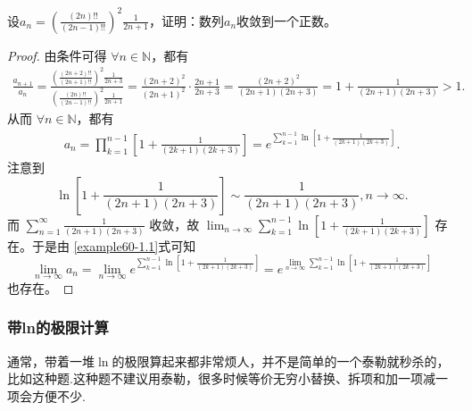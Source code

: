 \documentclass[../../main.tex]{subfiles}%
\begin{document}
\begin{example}
设\(a_n=\left(\frac{(2n)!!}{(2n - 1)!!}\right)^2\frac{1}{2n + 1}\)，证明：数列\(a_n\)收敛到一个正数。
\end{example}
\begin{proof}

由条件可得 \(\forall n\in \mathbb{N}\)，都有
\begin{align*}
\frac{a_{n+1}}{a_n}=\frac{\left( \frac{(2n+2)!!}{(2n+1)!!} \right) ^2\frac{1}{2n+3}}{\left( \frac{(2n)!!}{(2n-1)!!} \right) ^2\frac{1}{2n+1}}=\frac{\left( 2n+2 \right) ^2}{\left( 2n+1 \right) ^2}\cdot \frac{2n+1}{2n+3}=\frac{\left( 2n+2 \right) ^2}{\left( 2n+1 \right) \left( 2n+3 \right)}=1+\frac{1}{\left( 2n+1 \right) \left( 2n+3 \right)}>1.
\end{align*}
从而 \(\forall n\in \mathbb{N}\)，都有
\begin{align}
a_n=\prod_{k = 1}^{n - 1}\left[1+\frac{1}{(2k + 1)(2k + 3)}\right]=e^{\sum\limits_{k = 1}^{n - 1}\ln\left[1+\frac{1}{(2k + 1)(2k + 3)}\right]}. \label{example60-1.1}
\end{align}
注意到
\[
\ln\left[1+\frac{1}{(2n + 1)(2n + 3)}\right]\sim\frac{1}{(2n + 1)(2n + 3)},n\rightarrow\infty.
\]
而 \(\sum_{n = 1}^{\infty}\frac{1}{(2n + 1)(2n + 3)}\) 收敛，故 \(\lim_{n\rightarrow\infty}\sum_{k = 1}^{n - 1}\ln\left[1+\frac{1}{(2k + 1)(2k + 3)}\right]\) 存在。于是由 \eqref{example60-1.1}式可知
\[
\lim_{n\rightarrow\infty}a_n=\lim_{n\rightarrow\infty}e^{\sum\limits_{k = 1}^{n - 1}\ln\left[1+\frac{1}{(2k + 1)(2k + 3)}\right]}=e^{\lim\limits_{n\rightarrow\infty}\sum\limits_{k = 1}^{n - 1}\ln\left[1+\frac{1}{(2k + 1)(2k + 3)}\right]}
\]
也存在。

\end{proof}


\subsubsection{带ln的极限计算}
通常，带着一堆\(\ln\)的极限算起来都非常烦人，并不是简单的一个泰勒就秒杀的，比如这种题.这种题不建议用泰勒，很多时候等价无穷小替换、拆项和加一项减一项会方便不少.
\end{document}
